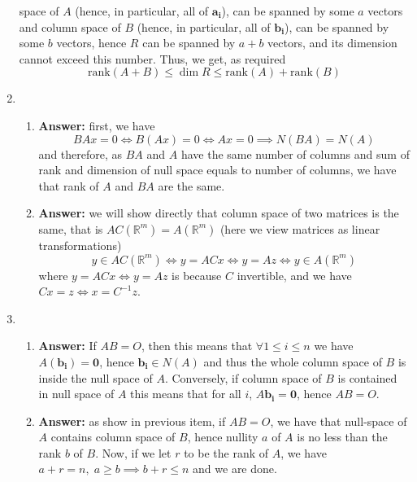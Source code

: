 \documentclass[8pt]{article} %
\begin{document}
\begin{enumerate}[1]
		space of $A$ (hence, in particular, all of $\mathbf{a_i}$), can be spanned by some $a$ vectors and column space
		of $B$ (hence, in particular, all of $\mathbf{b_i}$), can be spanned by some $b$ vectors, hence $R$ can be spanned
		by $a+b$ vectors, and its dimension cannot exceed this number. Thus, we get, as required
		\[\mbox{rank}(A+B)\leq\dim R\leq\mbox{rank}(A)+\mbox{rank}(B)\]
	\item \begin{enumerate}[\bf(a)]
			\item {\bf Answer: }first, we have
				\[BAx=0\iff B(Ax)=0\iff Ax=0\implies N(BA)=N(A)\]
				and therefore, as $BA$ and $A$ have the same number of columns and sum of rank and dimension
				of null space equals to number of columns, we have that rank of $A$ and $BA$ are the same.
			\item {\bf Answer: }we will show directly that column space of two matrices is the same, that is
				$AC(\mathbb{R}^m)=A(\mathbb{R}^m)$ (here we view matrices as linear transformations)
				\[y\in AC(\mathbb{R}^m)\iff y=ACx\iff y=Az\iff y\in A(\mathbb{R}^m)\]
				where $y=ACx\iff y=Az$ is because $C$ invertible, and we have $Cx=z\iff x=C^{-1}z$.
		\end{enumerate}
		\setcounter{enumi}{24}
	\item \begin{enumerate}[\bf(a)]
			\item {\bf Answer: }If $AB=O$, then this means that $\forall 1\leq i\leq n$ we have $A(\mathbf{b_i})=\mathbf{0
				}$, hence $\mathbf{b_i}\in N(A)$ and thus the whole column space of $B$ is inside the null space of $A
				$. Conversely, if column space of $B$ is contained in null space of $A$ this means that for all $i$,
				$A\mathbf{b_i}=\mathbf{0}$, hence $AB=O$.
			\item {\bf Answer: }as show in previous item, if $AB=O$, we have that null-space of $A$ contains
				column space of $B$, hence nullity $a$ of $A$ is no less than the rank $b$ of $B$. Now, if we let
				$r$ to be the rank of $A$, we have
				$a+r=n,\;a\geq b\implies b+r\leq n$ and we are done.
		\end{enumerate}
\end{enumerate}
\end{document}
